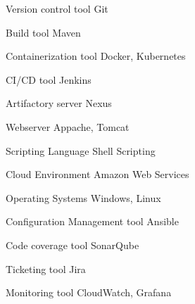 

\begin{cvskills}

  \cvskill
    {Version control tool} %
    {Git} %

  \cvskill
    {Build tool} %
    {Maven} %

  \cvskill
    {Containerization tool} %
    {Docker, Kubernetes} %

  \cvskill
    {CI/CD tool} %
    {Jenkins} %

  \cvskill
    {Artifactory server} %
    {Nexus} %

    \cvskill
    {Webserver} %
    {Appache, Tomcat} %

    \cvskill
    {Scripting Language} %
    {Shell Scripting} %

    \cvskill
    {Cloud Environment} %
    {Amazon Web Services} %

    \cvskill
    {Operating Systems} %
    {Windows, Linux} %

    \cvskill
    {Configuration Management tool} %
    {Ansible} %

    \cvskill
    {Code coverage tool} %
    {SonarQube} %

    \cvskill
    {Ticketing tool} %
    {Jira} %

    \cvskill
    {Monitoring tool} %
    {CloudWatch, Grafana} %

\end{cvskills}
